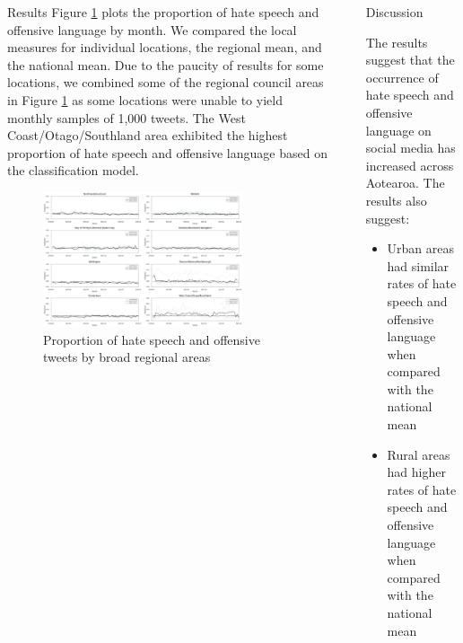 \documentclass[final]{beamer}
\newlength{\sepwidth}
\newlength{\largecolwidth}
\newlength{\smallcolwidth}
\newcommand{\separatorcolumn}{\begin{column}{\sepwidth}\end{column}}
\begin{document}
\begin{frame}[t]
\begin{columns}[t]
\begin{column}{\largecolwidth}
\begin{block}{Results}
  Figure \ref{fig:3} plots the proportion of hate speech and offensive language by month. We compared the local measures for individual locations, the regional mean, and the national mean. Due to the paucity of results for some locations, we combined some of the regional council areas in Figure \ref{fig:3} as some locations were unable to yield monthly samples of 1,000 tweets. The West Coast/Otago/Southland area exhibited the highest proportion of hate speech and offensive language based on the classification model.
 
    \begin{figure}
        \includegraphics[width=0.8\textwidth]{figures/figure_proportions.png}
        \caption{Proportion of hate speech and offensive tweets by broad regional areas}
        \label{fig:3}
    \end{figure}

  \end{block}

\end{column}

\separatorcolumn

\begin{column}{\smallcolwidth}

  \begin{block}{Discussion}

  The results suggest that the occurrence of hate speech and offensive language on social media has increased across Aotearoa. The results also suggest:
  
  \begin{itemize}
      \item Urban areas had similar rates of hate speech and offensive language when compared with the national mean
      \item Rural areas had higher rates of hate speech and offensive language when compared with the national mean
  \end{itemize}


\end{block}
\end{column}
\end{columns}
\end{frame}
\end{document}

